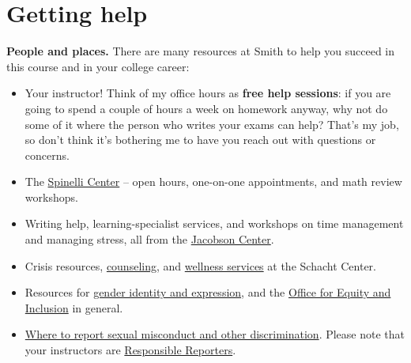\section{Getting help}
%
\textbf{People and places.} There are many resources at Smith to help you
succeed in this course and in your college career:
\begin{itemize}
  \item Your instructor! Think of my office hours as \textbf{free help
    sessions}: if you are going to spend a couple of hours a week on
    homework anyway, why not do some of it where the person who writes
    your exams can help? That's my job, so don't think it's bothering me
    to have you reach out with questions or concerns.
  \item The
    \href{https://www.smith.edu/academics/integrative-learning/spinelli-center-quantitative-learning}{Spinelli
    Center} -- open hours, one-on-one appointments, and math review
    workshops.
  \item Writing help, learning-specialist services, and workshops on
    time management and managing stress, all from the
    \href{https://www.smith.edu/academics/jacobson-center}{Jacobson
    Center}.
  \item Crisis resources,
    \href{https://www.smith.edu/your-campus/health-wellness/counseling-services}{counseling},
    and
    \href{https://www.smith.edu/your-campus/health-wellness}{wellness
    services} at the Schacht Center.
  \item Resources for
    \href{https://www.smith.edu/your-campus/offices-services/equity-inclusion/gender-identity-expression}{gender
    identity and expression}, and the
    \href{https://www.smith.edu/your-campus/offices-services/equity-inclusion}{Office
    for Equity and Inclusion} in general.
  \item \href{https://www.smith.edu/discover-smith/governance/institutional-policies/title-ix-smith-college}{Where
    to report sexual misconduct and other discrimination}. Please note
    that your instructors are
    \href{https://www.smith.edu/discover-smith/governance/title-ix-smith-college/responsible-reporters}{Responsible
    Reporters}.
\end{itemize}


